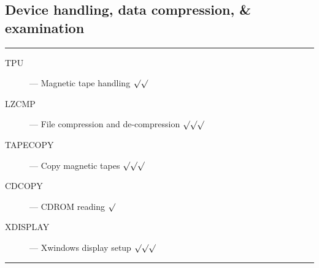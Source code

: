 \newpage

\subsection{Device handling, data compression, \& examination}

\rule{\textwidth}{0.5mm}
\begin{description}
\begin{description}
\item [TPU] --- Magnetic tape handling \hfill $\surd\surd$
\item [LZCMP] --- File compression and de-compression \hfill $\surd\surd\surd$
\item [TAPECOPY] --- Copy magnetic tapes \hfill $\surd\surd\surd$
\item [CDCOPY] --- CDROM reading \hfill $\surd$
\item [XDISPLAY] --- Xwindows display setup \hfill $\surd\surd\surd$
\end{description}
\end{description}
\rule{\textwidth}{0.5mm}

